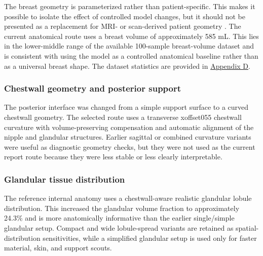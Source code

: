 The breast geometry is parameterized rather than patient-specific. This makes it possible to isolate the effect of controlled model changes, but it should not be presented as a replacement for MRI- or scan-derived patient geometry \cite{Samani2001,Hsu2011,Mazier2024}. The current anatomical route uses a breast volume of approximately 585 mL. This lies in the lower-middle range of the available 100-sample breast-volume dataset and is consistent with using the model as a controlled anatomical baseline rather than as a universal breast shape. The dataset statistics are provided in \hyperref[sec:appendix_volume_summary]{Appendix D}.

\subsubsection{Chestwall geometry and posterior support}

The posterior interface was changed from a simple support surface to a curved chestwall geometry. The selected route uses a transverse xoffset055 chestwall curvature with volume-preserving compensation and automatic alignment of the nipple and glandular structures. Earlier sagittal or combined curvature variants were useful as diagnostic geometry checks, but they were not used as the current report route because they were less stable or less clearly interpretable.

\subsubsection{Glandular tissue distribution}

The reference internal anatomy uses a chestwall-aware realistic glandular lobule distribution. This increased the glandular volume fraction to approximately 24.3\% and is more anatomically informative than the earlier single/simple glandular setup. Compact and wide lobule-spread variants are retained as spatial-distribution sensitivities, while a simplified glandular setup is used only for faster material, skin, and support scouts.

